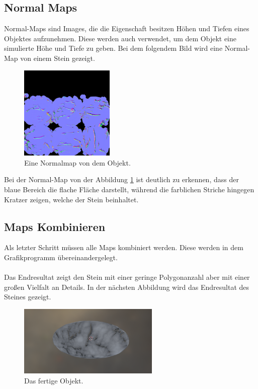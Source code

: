 \subsection{Normal Maps}

Normal-Maps sind Images, die die Eigenschaft besitzen Höhen und Tiefen eines Objektes aufzunehmen. Diese werden auch verwendet, um dem Objekt eine simulierte Höhe und Tiefe zu geben. Bei dem folgendem Bild wird eine Normal-Map von einem Stein gezeigt.

\begin{figure}[H]
    \centering
    \includegraphics[width=0.4\textwidth]{chapters/11/Images/SteinNormal.png}
    \caption{Eine Normalmap von dem Objekt.}
    \label{htl90}
\end{figure}

\noindent Bei der Normal-Map von der Abbildung \ref{htl90} ist deutlich zu erkennen, dass der blaue Bereich die flache Fläche darstellt, während die farblichen Striche hingegen Kratzer zeigen, welche der Stein beinhaltet.

\subsection{Maps Kombinieren}

Als letzter Schritt müssen alle Maps kombiniert werden. Diese werden in dem Grafikprogramm übereinandergelegt.\\\\
Das Endresultat zeigt den Stein mit einer geringe Polygonanzahl aber mit einer großen Vielfalt an Details. In der nächsten Abbildung wird das Endresultat des Steines gezeigt.

\begin{figure}[H]
    \centering
    \includegraphics[width=0.6\textwidth]{chapters/11/Images/SteinCombi.png}
    \caption{Das fertige Objekt.}
    \label{htl01}
\end{figure}

